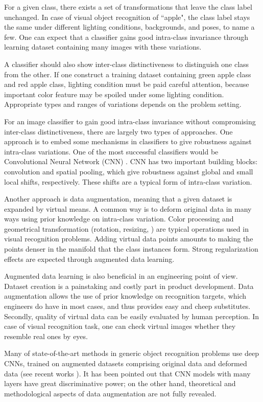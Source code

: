 \documentclass[10pt,twocolumn,letterpaper]{article}
\begin{document}
For a given class, there exists a set of transformations that leave the class label unchanged.
In case of visual object recognition of ``apple", the class label stays the same 
under different lighting conditions, backgrounds, and poses, to name a few.
One can expect that a classifier gains good intra-class invariance through learning dataset 
containing many images with these variations.

A classifier should also show inter-class distinctiveness to distinguish one class from the other.
If one construct a training dataset containing green apple class and red apple class, 
lighting condition must be paid careful attention, because important color feature may be spoiled 
under some lighting condition.
Appropriate types and ranges of variations depends on the problem setting.

For an image classifier to gain good intra-class invariance without compromising 
inter-class distinctiveness, there are largely two types of approaches.
One approach is to embed some mechanisms in classifiers to give robustness against intra-class variations.
One of the most successful classifiers would be Convolutional Neural Network (CNN) \cite{lecun-89e}.
CNN has two important building blocks: convolution and spatial pooling, which
give robustness against global and small local shifts, respectively.
These shifts are a typical form of intra-class variation.

Another approach is data augmentation, meaning that a given dataset is expanded by virtual means.
A common way is to deform original data in many ways using prior knowledge on intra-class variation.
Color processing and geometrical transformation (rotation, resizing, \etc) are typical operations
used in visual recognition problems.
Adding virtual data points amounts to making the points denser in the manifold that the class instances form.
Strong regularization effects are expected through augmented data learning.

Augmented data learning is also beneficial in an engineering point of view.
Dataset creation is a painstaking and costly part in product development.
Data augmentation allows the use of prior knowledge on recognition targets, 
which engineers do have in most cases,
and thus provides easy and cheep substitutes.
Secondly, quality of virtual data can be easily evaluated by human perception.
In case of visual recognition task, one can check virtual images whether they resemble real ones by eyes.

Many of state-of-the-art methods in generic object recognition problems use deep CNNs, trained on augmented datasets
comprising original data and deformed data 
(see recent works \cite{2015arXiv150102876W, 2014arXiv1409.4842S, NIPS2012_4824, 2015arXiv150201852H}).
It has been pointed out that CNN models with many layers
have great discriminative power; 
on the other hand, theoretical and methodological aspects of data augmentation are not fully revealed.
\end{document}
